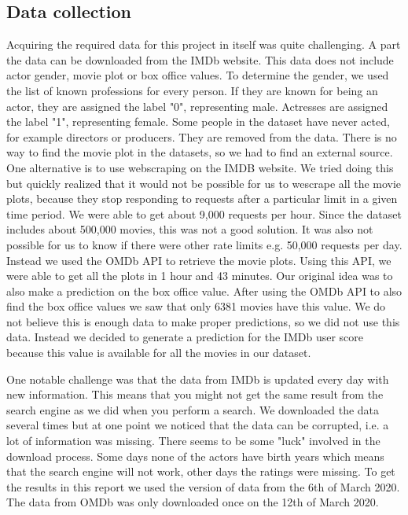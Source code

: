 
\subsection{Data collection}

Acquiring the required data for this project in itself was quite challenging. A part the data can be downloaded from the IMDb website\cite{IMDbInterfaces}. This data does not include actor gender, movie plot or box office values. To determine the gender, we used the list of known professions for every person. If they are known for being an actor, they are assigned the label "0", representing male. Actresses are assigned the label "1", representing female. Some people in the dataset have never acted, for example directors or producers. They are removed from the data. There is no way to find the movie plot in the datasets, so we had to find an external source. One alternative is to use webscraping on the IMDB website. We tried doing this but quickly realized that it would not be possible for us to wescrape all the movie plots, because they stop responding to requests after a particular limit in a given time period. We were able to get about 9,000 requests per hour. Since the dataset includes about 500,000 movies, this was not a good solution. It was also not possible for us to know if there were other rate limits e.g. 50,000 requests per day. Instead we used the OMDb API\cite{OMDb} to retrieve the movie plots. Using this API, we were able to get all the plots in 1 hour and 43 minutes. Our original idea was to also make a prediction on the box office value. After using the OMDb API to also find the box office values we saw that only 6381 movies have this value. We do not believe this is enough data to make proper predictions, so we did not use this data. Instead we decided to generate a prediction for the IMDb user score because this value is available for all the movies in our dataset.

One notable challenge was that the data from IMDb is updated every day with new information. This means that you might not get the same result from the search engine as we did when you perform a search. We downloaded the data several times but at one point we noticed that the data can be corrupted, i.e. a lot of information was missing. There seems to be some "luck" involved in the download process. Some days none of the actors have birth years which means that the search engine will not work, other days the ratings were missing. To get the results in this report we used the version of data from the 6th of March 2020. The data from OMDb was only downloaded once on the 12th of March 2020.



